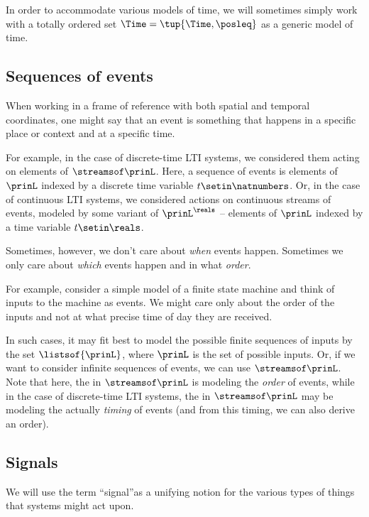 In order to accommodate various models of time, we will sometimes simply work with a totally ordered set $\Time = \tup{\Time, \posleq}$ as a generic model of time.

\subsection{Sequences of events}

When working in a frame of reference with both spatial and temporal coordinates, one might say that an event is something that happens in a specific place or context and at a specific time.

For example, in the case of discrete-time LTI systems, we considered them acting on elements of $\streamsof\prinL$.
Here, a sequence of events is elements of $\prinL$ indexed by a discrete time variable $t \setin \natnumbers$.
Or, in the case of continuous LTI systems, we considered actions on continuous streams of events, modeled by some variant of $\prinL^\reals$ -- elements of $\prinL$ indexed by a time variable $t \setin \reals$.

Sometimes, however, we don't care about \emph{when} events happen.
Sometimes we only care about  \emph{which} events happen and in what \emph{order}.

For example, consider a simple model of a finite state machine and think of inputs to the machine as events.
We might care only about the order of the inputs and not at what precise time of day they are received.

In such cases, it may fit best to model the possible finite sequences of inputs by the set $\listsof{\prinL}$, where $\prinL$ is the set of possible inputs.
Or, if we want to consider infinite sequences of events, we can use $\streamsof\prinL$.
Note that here, the \natnumbers  in $\streamsof\prinL$ is modeling the \emph{order} of events, while in the case of discrete-time LTI systems, the \natnumbers  in $\streamsof\prinL$ may be modeling the actually \emph{timing} of events (and from this timing, we can also derive an order).

\subsection{Signals}

We will use the term ``signal''as a unifying notion for the various types of things that systems might act upon.

